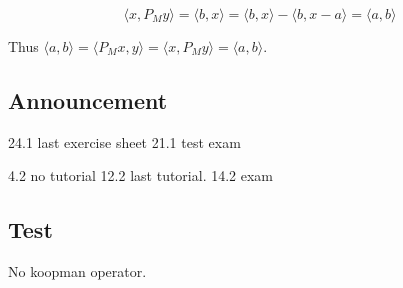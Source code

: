 \documentclass[11pt]{article}
\begin{document}
$$\langle x, P_M y \rangle = \langle b, x \rangle = \langle b, x \rangle - \langle b, x - a \rangle =
    \langle a, b\rangle$$

Thus \(\langle a, b \rangle = \langle P_M x, y \rangle = \langle x, P_M y
    \rangle = \langle a, b\rangle\).
\subsection{Announcement}
\label{sec:org90f9614}
24.1 last exercise sheet
21.1 test exam

4.2 no tutorial
12.2 last tutorial.
14.2 exam
\subsection{Test}
\label{sec:org4328820}
No koopman operator.
\end{document}
